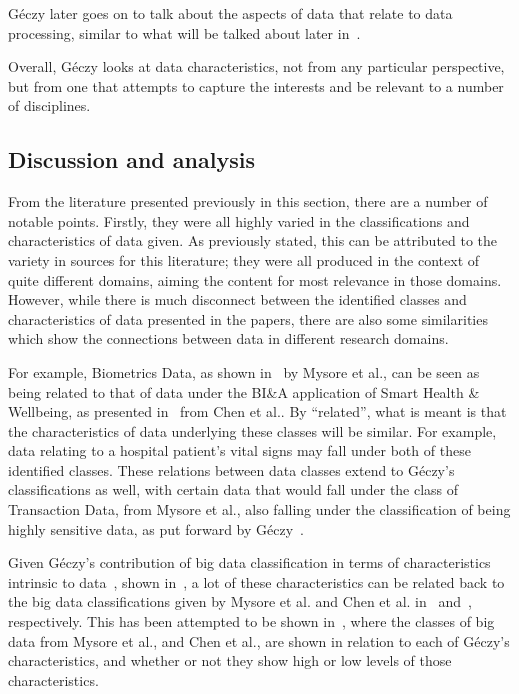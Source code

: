 \documentclass[a4paper,11pt]{article}
\begin{document}
G\'eczy later goes on to talk about the aspects of data that relate to data processing, similar to what will be talked
about later in~.

Overall, G\'eczy looks at data characteristics, not from any particular perspective, but from one that attempts to capture
the interests and be relevant to a number of disciplines.



\subsection{Discussion and analysis} %
\label{sub:classification_conclusion}

From the literature presented previously in this section, there are a number of notable points. Firstly, they were all
highly varied in the classifications and characteristics of data given. As previously stated, this can be attributed
to the variety in sources for this literature; they were all produced in the context of quite different domains, aiming
the content for most relevance in those domains. However, while there is much disconnect between the identified classes and
characteristics of data presented in the papers, there are also some similarities which show the connections
between data in different research domains.

For example, Biometrics Data, as shown in~ by Mysore et al.\cite{ibm_big_2013}, can be seen as
being related to that of data under the BI\&A application of Smart Health \& Wellbeing, as presented
in~ from Chen et al.\cite{chen2012business}. By ``related'', what is meant is that the
characteristics of data underlying these classes will be similar. For example, data relating to a hospital patient's
vital signs may fall under both of these identified classes. These relations between data classes extend to G\'eczy's
classifications as well, with certain data that would fall under the class of Transaction Data, from Mysore et
al.\cite{ibm_big_2013}, also falling under the classification of being highly sensitive data, as put forward by
G\'eczy~\cite{geczy_big_2014}.

Given G\'eczy's contribution of big data classification in terms of characteristics intrinsic to
data~\cite{geczy_big_2014}, shown in~, a lot of these characteristics can be related back
to the big data classifications given by Mysore et al.\cite{ibm_big_2013} and Chen et al.\cite{chen2012business}
in~ and~, respectively. This has been attempted to be shown
in~, where the classes of big data from Mysore et al., and Chen et al., are shown in
relation to each of G\'eczy's characteristics, and whether or not they show high or low levels of those characteristics.
\end{document}
